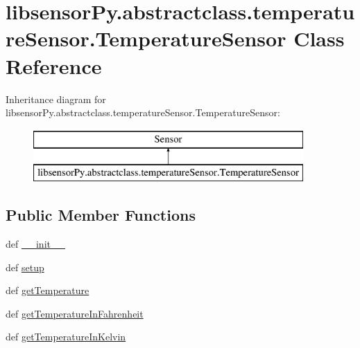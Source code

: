 \hypertarget{classlibsensorPy_1_1abstractclass_1_1temperatureSensor_1_1TemperatureSensor}{}\section{libsensor\+Py.\+abstractclass.\+temperature\+Sensor.\+Temperature\+Sensor Class Reference}
\label{classlibsensorPy_1_1abstractclass_1_1temperatureSensor_1_1TemperatureSensor}
Inheritance diagram for libsensor\+Py.\+abstractclass.\+temperature\+Sensor.\+Temperature\+Sensor\+:\begin{figure}[H]
\begin{center}
\leavevmode
\includegraphics[height=2.000000cm]{classlibsensorPy_1_1abstractclass_1_1temperatureSensor_1_1TemperatureSensor}
\end{center}
\end{figure}
\subsection*{Public Member Functions}
\begin{DoxyCompactItemize}
\item 
def \hyperlink{classlibsensorPy_1_1abstractclass_1_1temperatureSensor_1_1TemperatureSensor_aab743ae002b8406b44f897207cb3a08b}{\+\_\+\+\_\+init\+\_\+\+\_\+}
\item 
def \hyperlink{classlibsensorPy_1_1abstractclass_1_1temperatureSensor_1_1TemperatureSensor_a8efff86f7ecf3e0ddb49ff15b93dd485}{setup}
\item 
def \hyperlink{classlibsensorPy_1_1abstractclass_1_1temperatureSensor_1_1TemperatureSensor_a4d1cecfd332ec965eabd4a6c3f356777}{get\+Temperature}
\item 
def \hyperlink{classlibsensorPy_1_1abstractclass_1_1temperatureSensor_1_1TemperatureSensor_a67c13de8761ed7c7874359347514ed04}{get\+Temperature\+In\+Fahrenheit}
\item 
def \hyperlink{classlibsensorPy_1_1abstractclass_1_1temperatureSensor_1_1TemperatureSensor_a4cf49c95b1e01a4efa971f86714f20d3}{get\+Temperature\+In\+Kelvin}
\end{DoxyCompactItemize}
